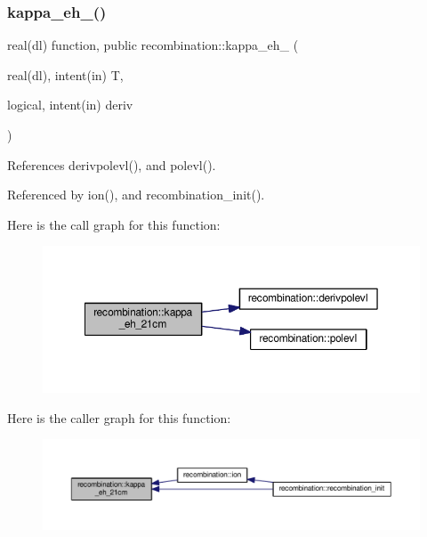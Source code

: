 \subsubsection{\texorpdfstring{kappa\+\_\+eh\+\_\+21cm()}{kappa\_eh\_21cm()}}
{\footnotesize\ttfamily real(dl) function, public recombination\+::kappa\+\_\+eh\+\_\+21cm (\begin{DoxyParamCaption}\item[{real(dl), intent(in)}]{T,  }\item[{logical, intent(in)}]{deriv }\end{DoxyParamCaption})}



References derivpolevl(), and polevl().



Referenced by ion(), and recombination\+\_\+init().

Here is the call graph for this function\+:
\nopagebreak
\begin{figure}[H]
\begin{center}
\leavevmode
\includegraphics[width=350pt]{namespacerecombination_ad379abd3309c2fd3f5cacb8b614b80a5_cgraph}
\end{center}
\end{figure}
Here is the caller graph for this function\+:
\nopagebreak
\begin{figure}[H]
\begin{center}
\leavevmode
\includegraphics[width=350pt]{namespacerecombination_ad379abd3309c2fd3f5cacb8b614b80a5_icgraph}
\end{center}
\end{figure}
\mbox{\label{namespacerecombination_a6456c5ea7f228fa74eba8e54de9eded5}} 

